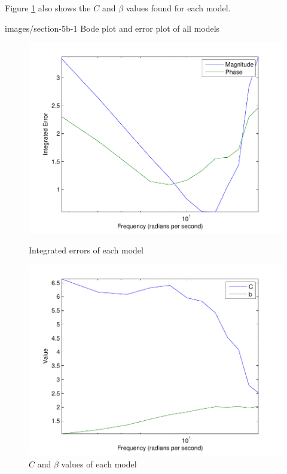 Figure \ref{5b-3} also shows the $C$ and $\beta$ values found for each model.

              {images/section-5b-1}
              {Bode plot and error plot of all models\label{5b-1}}

\begin{figure}
  \begin{minipage}{0.5\linewidth}
    \centering
    \includegraphics[width=\textwidth]{images/section-5b-2}
    \caption{\small Integrated errors of each model\label{5b-2}}
  \end{minipage}
  \begin{minipage}{0.5\linewidth}
    \centering
    \includegraphics[width=\textwidth]{images/section-5b-3}
    \caption{\small$C$ and $\beta$ values of each model\label{5b-3}}
  \end{minipage}
\end{figure}
